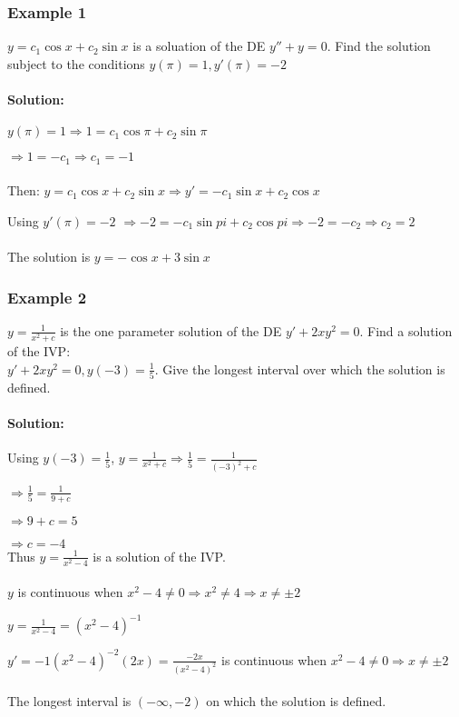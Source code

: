 \documentclass{article}
\begin{document}
\subsubsection{Example 1}
$y=c_1\cos{x}+c_2\sin{x}$ is a soluation of the DE $y''+y=0$. Find the solution subject to the conditions $y(\pi)=1, y'(\pi)=-2$

\paragraph{Solution:} $y(\pi)=1 \Rightarrow 1=c_1\cos{\pi}+c_2\sin{\pi}$

$\Rightarrow 1=-c_1 \Rightarrow c_1=-1$ \\\\
Then: $y=c_1\cos{x}+c_2\sin{x} \Rightarrow y'=-c_1\sin{x}+c_2\cos{x}$

Using $y'(\pi)=-2$ $\Rightarrow -2=-c_1\sin{pi}+c_2\cos{pi} \Rightarrow -2=-c_2 \Rightarrow c_2=2$\\\\
The solution is $y=-\cos{x}+3\sin{x}$

\subsubsection{Example 2}
$y=\frac{1}{x^2+c}$ is the one parameter solution of the DE $y'+2xy^2=0$. Find a solution of the IVP:\\ $y'+2xy^2=0, y(-3)=\frac{1}{5}$. Give the longest interval over which the solution is defined.

\newpage \paragraph{Solution:} Using $y(-3)=\frac{1}{5}$, $y=\frac{1}{x^2+c}\Rightarrow \frac{1}{5}=\frac{1}{(-3)^2+c}$

$\Rightarrow \frac{1}{5}=\frac{1}{9+c}$

$\Rightarrow 9+c=5$

$\Rightarrow c=-4$ \\
Thus $y=\frac{1}{x^2-4}$ is a solution of the IVP. \\\\
$y$ is continuous when $x^2-4\ne 0 \Rightarrow x^2\ne 4 \Rightarrow x\ne \pm 2$

$y=\frac{1}{x^2-4}=\left(x^2-4\right)^{-1}$

$y'=-1\left(x^2-4\right)^{-2}(2x)=\frac{-2x}{(x^2-4)^2}$ is continuous when $x^2-4\ne0\Rightarrow x\ne\pm2$ \\\\
The longest interval is $\left(-\infty, -2\right)$ on which the solution is defined.\\
\end{document}
